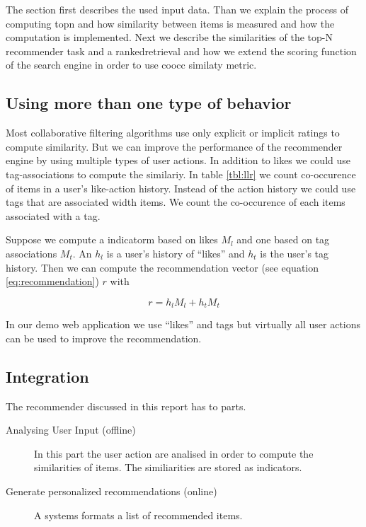 The section first describes the used input data. Than we explain the process of computing \gls{topn} and how similarity between items is measured and how the computation is implemented. Next we describe the similarities of the top-N recommender task and a \gls{rankedretrieval} and how we extend the scoring function of the search engine in order to use \gls{coocc} similaty metric.





\subsection{Using more than one type of behavior}
\label{sec:multimodal}

Most collaborative filtering algorithms use only explicit or implicit ratings to compute similarity.
But we can improve the performance of the recommender engine by using multiple types of user actions. In addition to likes we could use tag-associations to compute the similariy. In table \ref{tbl:llr} we count co-occurence of items in a user's like-action history. Instead of the action history we could use tags that are associated width items. We count the co-occurence of each items associated with a tag.

Suppose we compute a \gls{indicatorm} based on likes $M_l$ and one based on tag associations $M_t$. An $h_l$ is a user's history of ``likes'' and $h_t$ is the user's tag history. Then we can compute the recommendation vector (see equation \ref{eq:recommendation}) $r$ with

\begin{equation}
  \label{eq:multi}
  r = h_l M_l + h_t M_t
\end{equation}

In our demo web application we use ``likes'' and tags but virtually all user actions can be used to improve the recommendation.



\subsection{Integration}
\label{sec:integration}

The recommender discussed in this report has to parts.
\begin{description}
\item[Analysing User Input (offline)] In this part the user action are analised in order to compute the similarities of items. The similiarities are stored as indicators.
\item[Generate personalized recommendations (online)] A systems formats a list of recommended items.
\end{description}


